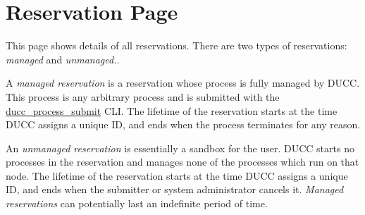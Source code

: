 % 
% 
% 
% 

\section{Reservation Page}
\label{sec:ws-reservations}

This page shows details of all reservations.  There are two types of reservations: {\em managed}
and {\em unmanaged.}.

A {\em managed reservation} is a reservation whose process is fully managed by DUCC.  This process
is any arbitrary process and is submitted with the
\hyperref[sec:cli.ducc-process-submit]{ducc\_process\_submit} CLI.  The lifetime of the reservation
starts at the time DUCC assigns a unique ID, and ends when the process terminates for any reason.

An {\em unmanaged reservation} is essentially a sandbox for the user.  DUCC starts no processes
in the reservation and manages none of the processes which run on that node.  The lifetime of the
reservation starts at the time DUCC assigns a unique ID, and ends when the submitter or system
administrator cancels it.  {\em Managed reservations} can potentially last an indefinite
period of time.

